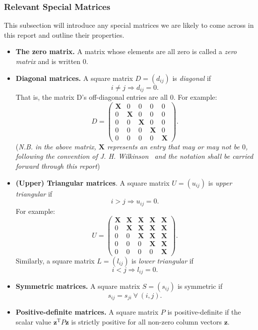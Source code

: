 \documentclass[10pt,a4paper]{article}
\numberwithin{equation}{section}
\theoremstyle{plain}
\theoremstyle{definition}
\newcommand{\mbfx}{\mathbf{X}}
\theoremstyle{own}
\begin{document}
\subsubsection{Relevant Special Matrices}
This subsection will introduce any special matrices we are likely to come across in this report and outline their properties.
\begin{itemize}
\item \textbf{The zero matrix.} A matrix whose elements are all zero is called a \textit{zero matrix} and is written $0$.
\item \textbf{Diagonal matrices.} A square matrix $D = (d_{ij})$ is \textit{diagonal} if \[i \neq j\Rightarrow d_{ij} = 0. \]
That is, the matrix D's off-diagonal entries are all 0. For example:
\[ D = \left( \begin{matrix}
						\mbfx & 0 & 0 & 0 & 0\\
						0 & \mbfx & 0 & 0 & 0\\
						0 & 0 & \mbfx & 0 & 0\\
						0 & 0 & 0 & \mbfx & 0\\
						0 & 0 & 0 & 0 & \mbfx \end{matrix} \right). \]
(\textit{N.B. in the above matrix, $\mbfx$ represents an entry that may or may not be $0$, following the convention of J. H. Wilkinson~\cite{Wilkinson} and the notation shall be carried forward through this report})
\item \textbf{(Upper) Triangular matrices}. A square matrix $U = (u_{ij})$ is \textit{upper triangular} if
\[ i > j \Rightarrow u_{ij} = 0. \]	
For example:
\[ U = \left( \begin{matrix}
						\mbfx & \mbfx & \mbfx & \mbfx & \mbfx\\
						0 & \mbfx & \mbfx & \mbfx & \mbfx\\
						0 & 0 & \mbfx & \mbfx & \mbfx\\
						0 & 0 & 0 & \mbfx & \mbfx\\
						0 & 0 & 0 & 0 & \mbfx \end{matrix} \right). \]	
Similarly, a square matrix $L = (l_{ij})$ is \textit{lower triangular} if
\[ i < j \Rightarrow l_{ij} = 0. \]
\item \textbf{Symmetric matrices.} A square matrix $S = (s_{ij})$ is symmetric if \[ s_{ij} = s_{ji}~\forall~(i,j).\]
\item \textbf{Positive-definite matrices.} A square matrix $P$ is positive-definite if the scalar value $\mathbf{z}^{\text{T}} P \mathbf{z}$ is strictly positive for all non-zero column vectors $\textbf{z}$.
\end{itemize}
\end{document}
